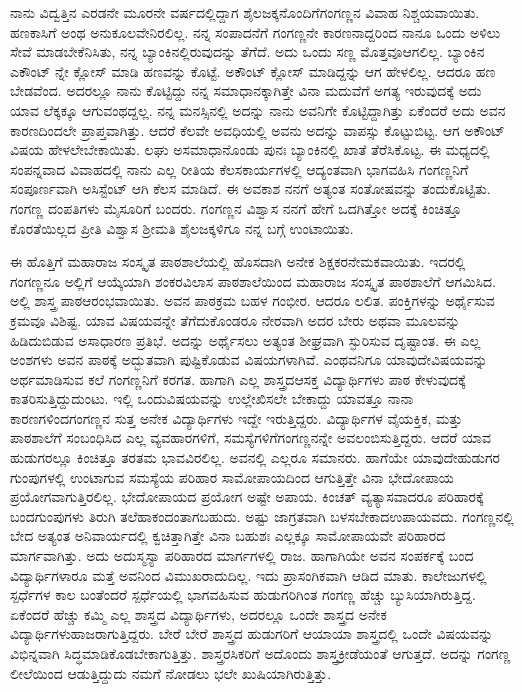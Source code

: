 {ನಾನು ವಿದ್ವತ್ತಿನ ಎರಡನೇ ಮೂರನೇ ವರ್ಷದಲ್ಲಿದ್ದಾಗ ಶೈಲಜಕ್ಕನೊಂದಿಗೆ\break ಗಂಗಣ್ಣನ ವಿವಾಹ ನಿಶ್ಚಯವಾಯಿತು. ಹಣಕಾಸಿಗೆ ಅಂಥ ಅನುಕೂಲವೇನಿರಲಿಲ್ಲ. ನನ್ನ ಸಂಪಾದನೆಗೆ ಗಂಗಣ್ಣನೇ ಕಾರಣನಾದ್ದರಿಂದ ನಾನೂ ಒಂದು ಅಳಿಲು ಸೇವೆ ಮಾಡ\-ಬೇಕೆನಿಸಿತು, ನನ್ನ ಬ್ಯಾಂಕಿನಲ್ಲಿರುವುದನ್ನು ತೆಗೆದೆ. ಅದು ಒಂದು ಸಣ್ಣ ಮೊತ್ತವೂ\break ಆಗಲಿಲ್ಲ. ಬ್ಯಾಂಕಿನ ಎಕೌಂಟ್ ನ್ನೇ ಕ್ಲೋಸ್ ಮಾಡಿ ಹಣವನ್ನು ಕೊಟ್ಟೆ. ಅಕೌಂಟ್ ಕ್ಲೋಸ್ ಮಾಡಿದ್ದನ್ನು ಆಗ ಹೇಳಲಿಲ್ಲ. ಆದರೂ ಹಣ ಬೇಡವೆಂದ. ಅದರಲ್ಲೂ ನಾನು ಕೊಟ್ಟಿದ್ದು ನನ್ನ ಸಮಾಧಾನಕ್ಕಾಗಿತ್ತೇ ವಿನಾ ಮದುವೆಗೆ ಅಗತ್ಯ ಇರುವುದಕ್ಕೆ ಅದು ಯಾವ ಲೆಕ್ಕಕ್ಕೂ ಆಗುವಂಥದ್ದಲ್ಲ. ನನ್ನ ಮನಸ್ಸಿನಲ್ಲಿ ಅದನ್ನು ನಾನು ಅವನಿಗೇ ಕೊಟ್ಟಿದ್ದಾಗಿತ್ತು ಏಕೆಂದರೆ ಅದು ಅವನ ಕಾರಣದಿಂದಲೇ ಪ್ರಾಪ್ತವಾಗಿತ್ತು. ಆದರೆ ಕೆಲವೇ ಅವಧಿಯಲ್ಲಿ ಅವನು ಅದನ್ನು ವಾಪಸ್ಸು ಕೊಟ್ಟುಬಿಟ್ಟ. ಆಗ ಅಕೌಂಟ್ ವಿಷಯ ಹೇಳಲೇಬೇಕಾಯಿತು. ಲಘು ಅಸಮಾಧಾನೊಂಡು ಪುನಃ ಬ್ಯಾಂಕಿನಲ್ಲಿ ಖಾತೆ ತೆರೆಸಿಕೊಟ್ಟ.  ಈ ಮಧ್ಯದಲ್ಲಿ ಸಂಪನ್ನವಾದ ವಿವಾಹದಲ್ಲಿ ನಾನು ಎಲ್ಲ ರೀತಿಯ ಕೆಲಸ\enginline{-}ಕಾರ್ಯಗಳಲ್ಲಿ ಆದ್ಯಂತವಾಗಿ ಭಾಗವಹಿಸಿ ಗಂಗಣ್ಣನಿಗೆ ಸಂಪೂರ್ಣವಾಗಿ ಅಸಿಸ್ಟೆಂಟ್ ಆಗಿ ಕೆಲಸ ಮಾಡಿದೆ. ಈ ಅವಕಾಶ ನನಗೆ ಅತ್ಯಂತ ಸಂತೋಷವನ್ನು ತಂದುಕೊಟ್ಟಿತು. ಗಂಗಣ್ಣ ದಂಪತಿಗಳು ಮೈಸೂರಿಗೆ ಬಂದರು. ಗಂಗಣ್ಣನ ವಿಶ್ವಾಸ ನನಗೆ ಹೇಗೆ ಒದಗಿತ್ತೋ ಅದಕ್ಕೆ ಕಿಂಚಿತ್ತೂ ಕೊರತೆಯಿಲ್ಲದ ಪ್ರೀತಿ ವಿಶ್ವಾಸ ಶ್ರೀಮತಿ ಶೈಲಜಕ್ಕಳಿಗೂ ನನ್ನ ಬಗ್ಗೆ ಉಂಟಾಯಿತು.

ಈ ಹೊತ್ತಿಗೆ ಮಹಾರಾಜ ಸಂಸ್ಕೃತ ಪಾಠಶಾಲೆಯಲ್ಲಿ ಹೊಸದಾಗಿ ಅನೇಕ ಶಿಕ್ಷಕರ\break ನೇಮಕವಾಯಿತು. ಇದರಲ್ಲಿ ಗಂಗಣ್ಣನೂ ಅಲ್ಲಿಗೆ ಆಯ್ಕೆಯಾಗಿ ಶಂಕರವಿಲಾಸ ಪಾಠಶಾಲೆಯಿಂದ ಮಹಾರಾಜ ಸಂಸ್ಕೃತ ಪಾಠಶಾಲೆಗೆ ಆಗಮಿಸಿದ. ಅಲ್ಲಿ ಶಾಸ್ತ್ರ ಪಾಠ\break ಆರಂಭವಾಯಿತು. ಅವನ ಪಾಠಕ್ರಮ ಬಹಳ ಗಂಭೀರ. ಆದರೂ ಲಲಿತ. ಪಂಕ್ತಿಗಳನ್ನು ಅರ್ಥೈಸುವ ಕ್ರಮವೂ ವಿಶಿಷ್ಟ. ಯಾವ ವಿಷಯವನ್ನೇ ತೆಗೆದುಕೊಂಡರೂ ನೇರವಾಗಿ ಅದರ ಬೇರು ಅಥವಾ ಮೂಲವನ್ನು ಹಿಡಿದುಬಿಡುವ ಅಸಾಧಾರಣ ಪ್ರತಿಭೆ. ಅದನ್ನು ಅರ್ಥೈಸಲು ಅತ್ಯಂತ ಶೀಘ್ರವಾಗಿ ಸ್ಫುರಿಸುವ ದೃಷ್ಟಾಂತ. ಈ ಎಲ್ಲ ಅಂಶಗಳು ಅವನ ಪಾಠಕ್ಕೆ ಅದ್ಭುತವಾಗಿ ಪುಷ್ಟಿಕೊಡುವ ವಿಷಯಗಳಾಗಿವೆ. ಎಂಥವನಿಗೂ ಯಾವುದೇ\break ವಿಷಯವನ್ನು ಅರ್ಥಮಾಡಿಸುವ ಕಲೆ ಗಂಗಣ್ಣನಿಗೆ ಕರಗತ. ಹಾಗಾಗಿ ಎಲ್ಲ ಶಾಸ್ತ್ರದ\break ಆಸಕ್ತ ವಿದ್ಯಾರ್ಥಿಗಳು ಪಾಠ ಕೇಳುವುದಕ್ಕೆ ಕಾತರಿಸುತ್ತಿದ್ದುದುಂಟು. ಇಲ್ಲಿ ಒಂದು\break ವಿಷಯವನ್ನು ಉಲ್ಲೇಖಿಸಲೇ ಬೇಕಾದ್ದು \enginline{-} ಯಾವತ್ತೂ ನಾನಾ ಕಾರಣಗಳಿಂದ\break ಗಂಗಣ್ಣನ ಸುತ್ತ ಅನೇಕ ವಿದ್ಯಾರ್ಥಿಗಳು ಇದ್ದೇ ಇರುತ್ತಿದ್ದರು. ವಿದ್ಯಾರ್ಥಿಗಳ ವೈಯಕ್ತಿಕ, ಮತ್ತು ಪಾಠಶಾಲೆಗೆ ಸಂಬಂಧಿಸಿದ ಎಲ್ಲ ವ್ಯವಹಾರಗಳಿಗೆ, ಸಮಸ್ಯೆಗಳಿಗೆ\break ಗಂಗಣ್ಣನನ್ನೇ ಅವಲಂಬಿಸುತ್ತಿದ್ದರು. ಆದರೆ ಯಾವ ಹುಡುಗರಲ್ಲೂ ಕಿಂಚಿತ್ತೂ ತರತಮ ಭಾವ\-ವಿರಲಿಲ್ಲ. ಅವನಲ್ಲಿ ಎಲ್ಲರೂ ಸಮಾನರು. ಹಾಗೆಯೇ ಯಾವುದೇ\break ಹುಡುಗರ ಗುಂಪುಗಳಲ್ಲಿ ಉಂಟಾಗುವ ಸಮಸ್ಯೆಯ ಪರಿಹಾರ ಸಾಮೋಪಾಯದಿಂದ ಆಗುತ್ತಿತ್ತೇ ವಿನಾ ಭೇದೋಪಾಯ ಪ್ರಯೋಗವಾಗುತ್ತಿರಲಿಲ್ಲ. ಭೇದೋಪಾಯದ ಪ್ರಯೋಗ ಅಷ್ಟೇ ಅಪಾಯ. ಕಿಂಚತ್ ವ್ಯತ್ಯಾಸವಾದರೂ  ಪರಿಹಾರಕ್ಕೆ ಬಂದ\break ಗುಂಪುಗಳು ತಿರುಗಿ ತಲೆ\-ಹಾಕಂದಂತಾಗಬಹುದು. ಅಷ್ಟು ಜಾಗ್ರತವಾಗಿ ಬಳಸಬೇಕಾದ\break ಉಪಾಯವದು. ಗಂಗಣ್ಣನಲ್ಲಿ ಬೇದ ಅತ್ಯಂತ ಅನಿವಾರ್ಯದಲ್ಲಿ ಕ್ವಚಿತ್ತಾಗಿತ್ತೇ ವಿನಾ ಬಹುಶಃ ಎಲ್ಲಕ್ಕೂ ಸಾಮೋಪಾಯವೇ ಪರಿಹಾರದ ಮಾರ್ಗವಾಗಿತ್ತು. ಅದು ಅದು\break ಸ್ಮಸ್ಯಾ ಪರಿಹಾರದ  ಮಾರ್ಗಗಳಲ್ಲಿ ರಾಜ. ಹಾಗಾಗಿಯೇ ಅವನ ಸಂಪರ್ಕಕ್ಕೆ ಬಂದ ವಿದ್ಯಾರ್ಥಿಗಳಾರೂ ಮತ್ತೆ ಅವನಿಂದ ವಿಮುಖರಾದುದಿಲ್ಲ. ಇದು ಪ್ರಾಸಂಗಿಕವಾಗಿ ಆಡಿದ ಮಾತು.  ಕಾಲೇಜುಗಳಲ್ಲಿ  ಸ್ಪರ್ಧೆಗಳ ಕಾಲ ಬಂತೆಂದರೆ ಸ್ಪರ್ಧೆಯಲ್ಲಿ ಭಾಗ\-ವಹಿಸುವ ಹುಡುಗರಿಗಿಂತ ಗಂಗಣ್ಣ ಹೆಚ್ಚು ಬ್ಯುಸಿಯಾಗಿರುತ್ತಿದ್ದ. ಏಕೆಂದರೆ ಹೆಚ್ಚು ಕಮ್ಮಿ ಎಲ್ಲ ಶಾಸ್ತ್ರದ ವಿದ್ಯಾರ್ಥಿಗಳು, ಅದರಲ್ಲೂ ಒಂದೇ ಶಾಸ್ತ್ರದ ಅನೇಕ ವಿದ್ಯಾರ್ಥಿಗಳು\break ಹಾಜರಾಗುತ್ತಿದ್ದರು. ಬೇರೆ ಬೇರೆ ಶಾಸ್ತ್ರದ ಹುಡುಗರಿಗೆ ಆಯಾಯಾ ಶಾಸ್ತ್ರದಲ್ಲಿ ಒಂದೇ ವಿಷಯವನ್ನು ವಿಭಿನ್ನವಾಗಿ ಸಿದ್ಧಮಾಡಿಕೊಡಬೇಕಾಗುತ್ತಿತ್ತು. ಶಾಸ್ತ್ರರಸಿಕರಿಗೆ ಅದೊಂದು ಶಾಸ್ತ್ರಕ್ರೀಡೆಯಂತೆ ಆಗುತ್ತದೆ. ಅದನ್ನು ಗಂಗಣ್ಣ ಲೀಲೆಯಿಂದ  ಆಡುತ್ತಿದ್ದುದು ನಮಗೆ ನೋಡಲು ಭಲೇ ಖುಷಿಯಾಗಿರುತ್ತಿತ್ತು.
\vskip 8pt

}
